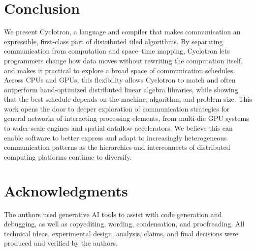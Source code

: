 \documentclass[sigplan, nonacm]{acmart}
\begin{document}
\section{Conclusion}
We present Cyclotron, a language and compiler that makes communication an expressible, first-class part of distributed tiled algorithms. By separating communication from computation and space--time mapping, Cyclotron lets programmers change how data moves without rewriting the computation itself, and makes it practical to explore a broad space of communication schedules. Across CPUs and GPUs, this flexibility allows Cyclotron to match and often outperform hand-optimized distributed linear algebra libraries, while showing that the best schedule depends on the machine, algorithm, and problem size. This work opens the door to deeper exploration of communication strategies for general networks of interacting processing elements, from multi-die GPU systems to wafer-scale engines and spatial dataflow accelerators. We believe this can enable software to better express and adapt to increasingly heterogeneous communication patterns as the hierarchies and interconnects of distributed computing platforms continue to diversify.


\section*{Acknowledgments}
The authors used generative AI tools to assist with code generation and debugging, as well as copyediting, wording, condensation, and proofreading. All technical ideas, experimental design, analysis, claims, and final decisions were produced and verified by the authors.
\end{document}
